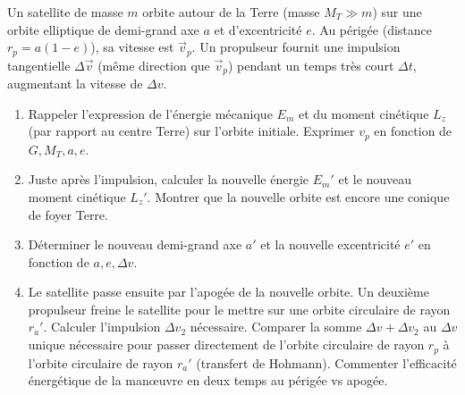 \documentclass[11pt]{article}
\begin{document}
\begin{exercice}
Un satellite de masse $m$ orbite autour de la Terre (masse $M_T \gg m$) sur une orbite elliptique de demi-grand axe $a$ et d'excentricité $e$. Au périgée (distance $r_p = a(1-e)$), sa vitesse est $\vec{v}_p$. Un propulseur fournit une impulsion tangentielle $\Delta \vec{v}$ (même direction que $\vec{v}_p$) pendant un temps très court $\Delta t$, augmentant la vitesse de $\Delta v$.
\begin{enumerate}
    \item Rappeler l'expression de l'énergie mécanique $E_m$ et du moment cinétique $L_z$ (par rapport au centre Terre) sur l'orbite initiale. Exprimer $v_p$ en fonction de $G, M_T, a, e$.
    \item Juste après l'impulsion, calculer la nouvelle énergie $E_m'$ et le nouveau moment cinétique $L_z'$. Montrer que la nouvelle orbite est encore une conique de foyer Terre.
    \item Déterminer le nouveau demi-grand axe $a'$ et la nouvelle excentricité $e'$ en fonction de $a, e, \Delta v$.
    \item Le satellite passe ensuite par l'apogée de la nouvelle orbite. Un deuxième propulseur freine le satellite pour le mettre sur une orbite circulaire de rayon $r_a'$. Calculer l'impulsion $\Delta v_2$ nécessaire. Comparer la somme $\Delta v + \Delta v_2$ au $\Delta v$ unique nécessaire pour passer directement de l'orbite circulaire de rayon $r_p$ à l'orbite circulaire de rayon $r_a'$ (transfert de Hohmann). Commenter l'efficacité énergétique de la manœuvre en deux temps au périgée vs apogée.
\end{enumerate}
\end{exercice}
\end{document}
